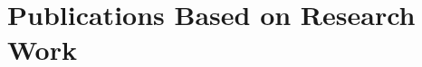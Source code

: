 \section{Publications Based on Research Work}
\label{sec:publications}
    
    
    
    
    
    

